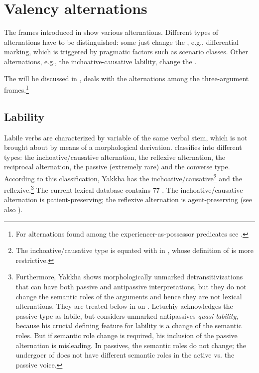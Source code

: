 \section{Valency alternations} \label{valclass}
 
The frames introduced in  show various alternations.  Different types of alternations have to be distinguished: some just change the , e.g., differential  marking, which is triggered by pragmatic factors such as  scenario classes. Other alternations, e.g., the inchoative-causative lability, change the . 

The   will be discussed  in ,    deals with the alternations among the three-argument frames.\footnote{For alternations found among the experiencer-as-possessor predicates see .} 


\subsection{Lability}\label{labile}

\largerpage[-1]
Labile verbs are characterized by variable  of the same verbal stem, which is not brought about by means of a morphological derivation. \citet[224]{Letuchiy2009Labile} classifies   into different types: the inchoative/causative alternation, the reflexive alternation, the reciprocal alternation, the passive (extremely rare) and the converse type. According to this classification, Yakkha has the inchoative/causative\footnote{The inchoative/causative type is equated with  in \citet{Haspelmath1993More}, whose definition of  is more restrictive.} and the reflexive.\footnote{Furthermore, Yakkha shows morphologically unmarked detransitivizations that can have both passive and antipassive interpretations, but they do not change the semantic roles of the arguments and hence they are not lexical alternations. They are treated below in  on . Letuchiy acknowledges the passive-type as labile, but considers unmarked antipassives \emph{quasi-lability}, because his crucial defining feature for lability is a change of the semantic roles. But if semantic role change is required, his inclusion of the passive alternation is misleading. In passives, the semantic roles do not change; the undergoer of  does not have different semantic roles in the active vs. the passive voice.} The current lexical database contains 77 . The inchoative/causative alternation is patient-preserving; the reflexive alternation is agent-preserving (see also \citealt[223]{Letuchiy2009Labile}). 

